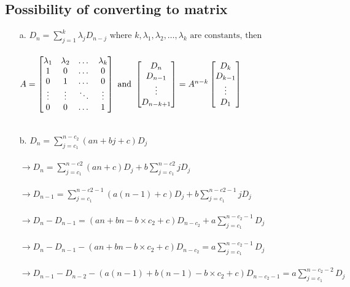 \subsection{Possibility of converting to matrix}
\begin{enumerate}
    \item[a.]$D_n = \sum_{j=1}^k \lambda_j D_{n-j}\text{ where }k,\lambda_1, \lambda_2, \dots, \lambda_k \text{ are constants, then}$ \\
    \\
    $A=\begin{bmatrix}
    \lambda_1 & \lambda_2 & \dots & \lambda_k\\
    1 & 0 & \dots & 0\\
    0 & 1 & \dots & 0\\
    \vdots & \vdots & \ddots  & \vdots \\
    0 & 0 & \dots & 1 
    \end{bmatrix}
    \text{ and }
    \begin{bmatrix}
    D_n \\
    D_{n-1}\\
    \vdots \\
    D_{n-k+1}
    \end{bmatrix}
    =
    A^{n-k}
    \begin{bmatrix}
    D_{k} \\
    D_{k-1}\\
    \vdots \\
    D_{1}
    \end{bmatrix}\\
$
    \\\
    \item[b.] $D_n = \sum_{j=c_1}^{n-c_2} (an+bj+c) D_j$ \\
    \\
    $\rightarrow D_n = \sum_{j=c_1}^{n-c2}(an+c)D_j + b\sum_{j=c_1}^{n-c2}jD_j$\\
    \\
    $\rightarrow D_{n-1} = \sum_{j=c_1}^{n-c2-1}(a(n-1)+c)D_j + b\sum_{j=c_1}^{n-c2-1}jD_j$\\
    \\
    $\rightarrow D_n - D_{n-1} = (an+bn-b\times c_2+c)D_{n-c_2} + a\sum_{j=c_1}^{n-c_2-1}D_j$ \\
    \\
    $\rightarrow D_n - D_{n-1} - (an+bn-b\times c_2+c)D_{n-c_2} = a\sum_{j=c_1}^{n-c_2-1}D_j$\\
    \\
    $\rightarrow D_{n-1} - D_{n-2} - (a(n-1)+b(n-1)-b\times c_2+c)D_{n-c_2-1} = a\sum_{j=c_1}^{n-c_2-2}D_j$\\

\end{enumerate}
